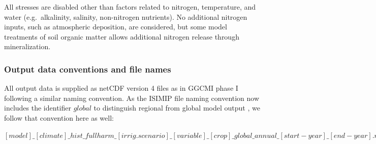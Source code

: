 \documentclass[gmd, manuscript]{copernicus} %
\begin{document}
All stresses are disabled other than factors related to nitrogen, temperature, and water (e.g.\ alkalinity, salinity, non-nitrogen nutrients). 
No additional nitrogen inputs, such as atmospheric deposition, are considered, but some model treatments of soil organic matter allows additional nitrogen release through mineralization. 


\subsubsection{Output data conventions and file names}

All output data is supplied as netCDF version 4 files as in GGCMI phase I \citep{Elliott2015} following a similar naming convention. As the ISIMIP file naming convention now includes the identifier $global$ to distinguish regional from global model output \citep{frieler2017assessing}, we follow that convention here as well:

$[model]\_[climate]\_hist\_fullharm\_[irrig.scenario]\_[variable]\_[crop]\_global\_annual\_[start-year]\_[end-year].nc4$
\end{document}
